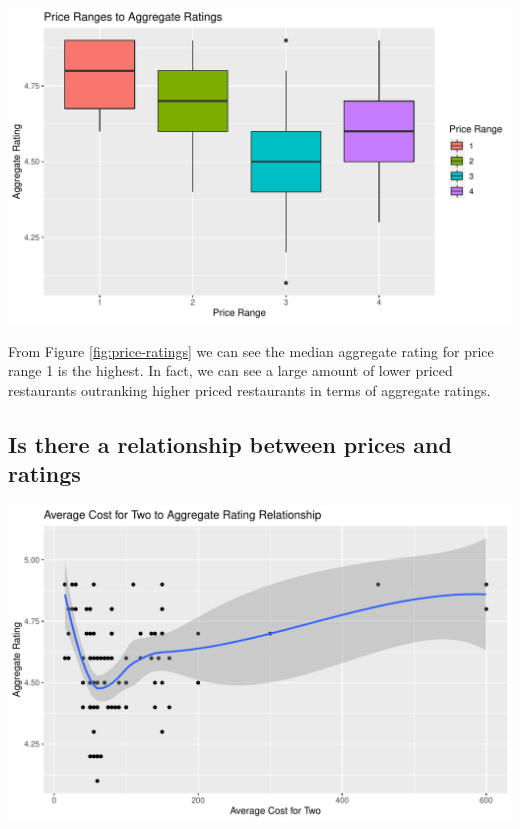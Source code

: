 \documentclass[11pt,a4paper,]{article}
\let\origfigure\figure
\let\endorigfigure\endfigure
\renewenvironment{figure}[1][2] {
    \expandafter\origfigure\expandafter[H]
} {
    \endorigfigure
}%
\begin{document}
\begin{figure}
\centering
\includegraphics{assignment4_files/figure-latex/price-ratings-1.pdf}
\caption{\label{fig:price-ratings}Price Ranges to Aggregate Ratings}
\end{figure}

From Figure \ref{fig:price-ratings} we can see the median aggregate rating for price range 1 is the highest. In fact, we can see a large amount of lower priced restaurants outranking higher priced restaurants in terms of aggregate ratings.

\hypertarget{is-there-a-relationship-between-prices-and-ratings}{%
\subsection{Is there a relationship between prices and ratings}\label{is-there-a-relationship-between-prices-and-ratings}}

\begin{figure}
\centering
\includegraphics{assignment4_files/figure-latex/cost-rating-relationship-1.pdf}
\caption{\label{fig:cost-rating-relationship}Average Cost for Two to Aggregate Rating Relationship}
\end{figure}
\end{document}
